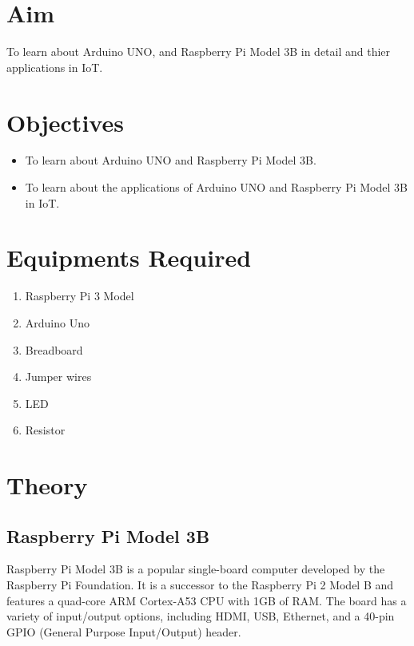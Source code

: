 \documentclass[11pt]{article}
\begin{document}
\tableofcontents
\thispagestyle{empty}
\clearpage

\setcounter{page}{1}

\section{Aim}
To learn about Arduino UNO, and Raspberry Pi Model 3B in detail and thier applications in IoT.

\section{Objectives}
\begin{itemize}
	\item To learn about Arduino UNO and Raspberry Pi Model 3B.
	\item To learn about the applications of Arduino UNO and Raspberry Pi Model 3B in IoT.
\end{itemize}


\section{Equipments Required}
\begin{enumerate}
	\item Raspberry Pi 3 Model
	\item Arduino Uno
	\item Breadboard
	\item Jumper wires
	\item LED
	\item Resistor
\end{enumerate}


\section{Theory}


\subsection{Raspberry Pi Model 3B}

Raspberry Pi Model 3B is a popular single-board computer developed by the Raspberry Pi Foundation. It is a successor to the Raspberry Pi 2 Model B and features a quad-core ARM Cortex-A53 CPU with 1GB of RAM. The board has a variety of input/output options, including HDMI, USB, Ethernet, and a 40-pin GPIO (General Purpose Input/Output) header. \\
\end{document}
